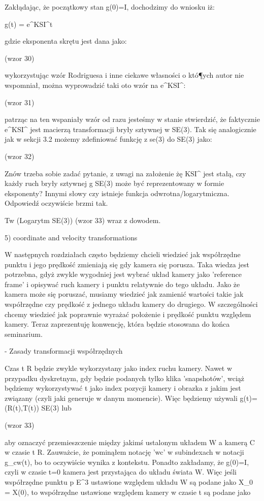Zakłądając, że początkowy stan g(0)=I, dochodzimy do wniosku iż:

g(t) = e^KSI^t

gdzie eksponenta skrętu jest dana jako:

(wzor 30)

wykorzystując wzór Rodriguesa i inne ciekawe własności o któ¶ych autor nie wspomniał, można wyprowadzić taki oto wzór na e^KSI^:

(wzor 31)

patrząc na ten wspaniały wzór od razu jesteśmy w stanie stwierdzić, że faktycznie e^KSI^ jest macierzą transformacji bryły sztywnej w SE(3). Tak się analogicznie jak w sekcji 3.2 możemy zdefiniować funkcję z se(3) do SE(3) jako:

(wzor 32)

Znów trzeba sobie zadać pytanie, z uwagi na założenie żę KSI^ jest stałą, czy każdy ruch bryły sztywnej g \in SE(3) może być reprezentowany w formie eksponenty? Innymi słowy czy istnieje funkcja odwrotna/logarytmiczna. Odpowiedź oczywiście brzmi tak.

Tw (Logarytm SE(3)) (wzor 33) wraz z dowodem.


5) coordinate and velocity transformations

W następnych rozdziałach często będziemy chcieli wiedzieć jak współrzędne punktu i jego prędkość zmieniają się gdy kamera się porusza. Taka wiedza jest potrzebna, gdyż zwykle wygodniej jest wybrać układ kamery jako 'reference frame' i opisywać ruch kamery i punktu relatywnie do tego układu. Jako że kamera może się poruszać, musiamy wiedzieć jak zamienić wartości takie jak współrzędne czy prędkość z jednego układu kamery do drugiego. W szczególności chcemy wiedzieć jak poprawnie wyrażać położenie i prędkość punktu względem kamery. Teraz zaprezentuję konwencję, która będzie stosowana do końca seminarium.

- Zasady transformacji współrzędnych

Czas t \in R będzie zwykle wykorzystany jako index ruchu kamery. Nawet w przypadku dyskretnym, gdy będzie podanych tylko klika 'snapshotów', wciąż będziemy wykorzystywać t jako index pozycji kamery i obrazka z jakim jest związany (czyli jaki generuje w danym momencie). Więc będziemy używali g(t)=(R(t),T(t)) \in SE(3) lub

(wzor 33)

aby oznaczyć przemieszczenie między jakimś ustalonym układem W a kamerą C w czasie t \in R. Zauważcie, że pominąłem notację 'wc' w subindexach w notacji g_cw(t), bo to oczywiście wynika z kontekstu. Ponadto zakładamy, że g(0)=I, czyli w czasie t=0 kamera jest przystająca do układu świata W. Więc jeśli współrzędne punktu p \in E^3 ustawione względem układu W są podane jako X_0 = X(0), to współrzędne ustawione względem kamery w czasie t są podane jako

